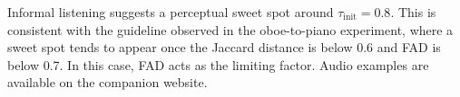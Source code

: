 Informal listening suggests a perceptual sweet spot around $\tau_\text{init}= 0.8$. This is consistent with the guideline observed in the oboe-to-piano experiment, where a sweet spot tends to appear once the Jaccard distance is below 0.6 and FAD is below 0.7. In this case, FAD acts as the limiting factor. Audio examples are available on the companion website.
